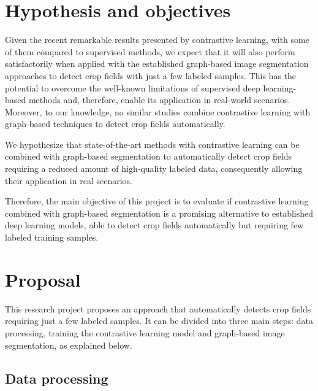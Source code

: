 \documentclass[12pt]{article}
\begin{document}

% 

\section{Hypothesis and objectives}\label{section:objetivos}

Given the recent remarkable results presented by contrastive learning, with some of them compared to supervised methods, we expect that it will also perform satisfactorily when applied with the established graph-based image segmentation approaches to detect crop fields with just a few labeled samples. This has the potential to overcome the well-known limitations of supervised deep learning-based methods and, therefore, enable its application in real-world scenarios. Moreover, to our knowledge, no similar studies combine contrastive learning with graph-based techniques to detect crop fields automatically.

We hypothesize that state-of-the-art methods with contrastive learning can be combined with graph-based segmentation to automatically detect crop fields requiring a reduced amount of high-quality labeled data, consequently allowing their application in real scenarios.

Therefore, the main objective of this project is to evaluate if contrastive learning combined with graph-based segmentation is a promising alternative to established deep learning models, able to detect crop fields automatically but requiring few labeled training samples. 


\section{Proposal}\label{section:proposal}

This research project proposes an approach that automatically detects crop fields requiring just a few labeled samples. It can be divided into three main steps: data processing, training the contrastive learning model and graph-based image segmentation, as explained below.

\subsection{Data processing}\label{subsection:dataprocessing}
\end{document}
